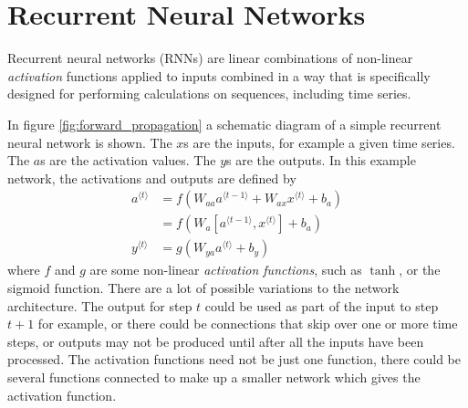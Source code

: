 \documentclass[a4paper,12pt]{article}
\theoremstyle{definition}
\begin{document}
\section{Recurrent Neural Networks}
Recurrent neural networks (RNNs) are linear combinations of non-linear \textit{activation} functions applied to inputs combined in a way that is specifically designed for performing calculations on sequences, including time series.

In figure \ref{fig:forward_propagation} a schematic diagram of a simple recurrent neural network is shown. The $x$s are the inputs, for example a given time series. The $a$s are the activation values. The $y$s are the outputs. In this example network, the activations and outputs are defined by 
\begin{align}
	a^{\langle t \rangle} &= f(W_{aa}a^{\langle t-1 \rangle} + W_{ax}x^{\langle t \rangle} + b_a) \\
	&= f(W_{a}[a^{\langle t-1 \rangle}, x^{\langle t \rangle}] + b_a) \\
	y^{\langle t \rangle} &= g(W_{ya}a^{\langle t \rangle} + b_y)
\end{align}
where $f$ and $g$ are some non-linear \textit{activation functions}, such as $\tanh$, or the sigmoid function. There are a lot of possible variations to the network architecture. The output for step $t$ could be used as part of the input to step $t+1$ for example, or there could be connections that skip over one or more time steps, or outputs may not be produced until after all the inputs have been processed. The activation functions need not be just one function, there could be several functions connected to make up a smaller network which gives the activation function.
\end{document}
